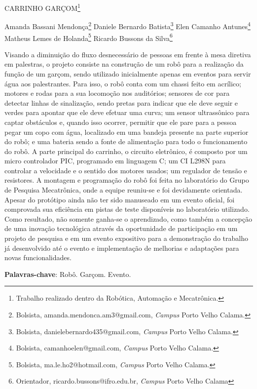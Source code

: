\documentclass[article,12pt,onesidea,4paper,english,brazil]{abntex2}
\begin{document}
	
	
	\frenchspacing 
	
	\begin{center}
		\LARGE CARRINHO GARÇOM\footnote{Trabalho realizado dentro da Robótica, Automação e Mecatrônica.}
		
		\normalsize
		Amanda Bassani Mendonça\footnote{Bolsista, amanda.mendonca.am3@gmail.com, \textit{Campus} Porto Velho Calama.} 
		Daniele Bernardo Batista\footnote{Bolsista, danielebernardo435@gmail.com, \textit{Campus} Porto Velho Calama.} 
		Elen Camanho Antunes\footnote{Bolsista, camanhoelen@gmail.com, \textit{Campus} Porto Velho Calama.} 
		Matheus Lemes de Holanda\footnote{Bolsista, ma.le.ho2@hotmail.com, \textit{Campus} Porto Velho Calama.}
		Ricardo Bussons da Silva\footnote{Orientador, ricardo.bussons@ifro.edu.br, \textit{Campus} Porto Velho Calama} 
	\end{center}
	
	\noindent Visando a diminuição do fluxo desnecessário de pessoas em frente à mesa diretiva
	em palestras, o projeto consiste na construção de um robô para a realização da
	função de um garçom, sendo utilizado inicialmente apenas em eventos para servir
	água aos palestrantes. Para isso, o robô conta com um chassi feito em acrílico;
	motores e rodas para a sua locomoção nos auditórios; sensores de cor para detectar
	linhas de sinalização, sendo pretas para indicar que ele deve seguir e verdes para
	apontar que ele deve efetuar uma curva; um sensor ultrassônico para captar
	obstáculos e, quando isso ocorrer, permitir que ele pare para a pessoa pegar um
	copo com água, localizado em uma bandeja presente na parte superior do robô; e
	uma bateria sendo a fonte de alimentação para todo o funcionamento do robô. A
	parte principal do carrinho, o circuito eletrônico, é composto por um micro
	controlador PIC, programado em linguagem C; um CI L298N para controlar a
	velocidade e o sentido dos motores usados; um regulador de tensão e resistores. A
	montagem e programação do robô foi feita no laboratório do Grupo de Pesquisa
	Mecatrônica, onde a equipe reuniu-se e foi devidamente orientada. Apesar do
	protótipo ainda não ter sido manuseado em um evento oficial, foi comprovada sua
	eficiência em pistas de teste disponíveis no laboratório utilizado. Como resultado,
	não somente ganha-se o aprendizado, como também a concepção de uma inovação
	tecnológica através da oportunidade de participação em um projeto de pesquisa e
	em um evento expositivo para a demonstração do trabalho já desenvolvido até o
	evento e implementação de melhorias e adaptações para novas funcionalidades.
	
	\vspace{\onelineskip}
	
	\noindent
	\textbf{Palavras-chave}: Robô. Garçom. Evento.
	
\end{document}
